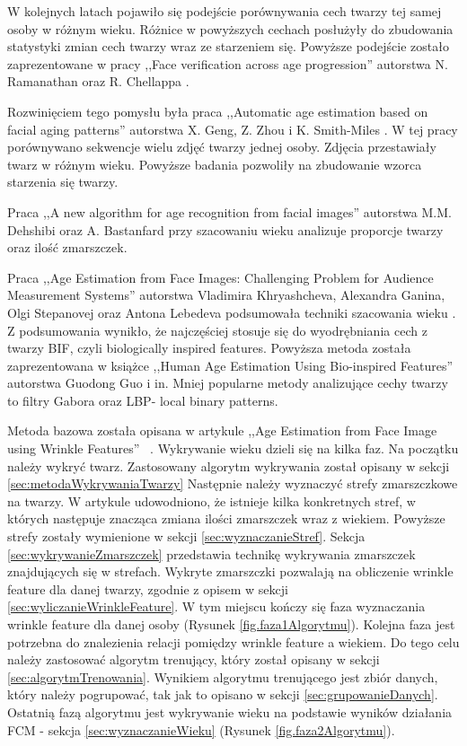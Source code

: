 \documentclass[a4paper,twoside,12pt]{book}
\begin{document}
    W kolejnych latach pojawiło się podejście porównywania cech twarzy tej samej osoby w różnym wieku.
    Różnice w powyższych cechach posłużyły do zbudowania statystyki zmian cech twarzy wraz ze starzeniem się.
    Powyższe podejście zostało zaprezentowane w pracy ,,Face verification across age progression''
    autorstwa N. Ramanathan oraz R. Chellappa \cite{ramanthanChelappa}.

    Rozwinięciem tego pomysłu była praca ,,Automatic age estimation based
    on facial aging patterns'' autorstwa X. Geng, Z. Zhou i K. Smith-Miles \cite{gengZhou}.
    W tej pracy porównywano sekwencje wielu zdjęć twarzy jednej osoby.
    Zdjęcia przestawiały twarz w różnym wieku.
    Powyższe badania pozwoliły na zbudowanie wzorca starzenia się twarzy.

    Praca ,,A new algorithm for age recognition
    from facial images'' autorstwa M.M. Dehshibi oraz A. Bastanfard \cite{dehshibiBastard} przy szacowaniu wieku
    analizuje proporcje twarzy oraz ilość zmarszczek.

    Praca ,,Age Estimation from Face Images: Challenging
    Problem for Audience Measurement Systems'' autorstwa
    Vladimira Khryashcheva, Alexandra Ganina, Olgi Stepanovej oraz
    Antona Lebedeva podsumowała techniki szacowania wieku \cite{khryashchevGanin}.
    Z podsumowania wynikło, że najczęściej stosuje się do wyodrębniania cech z twarzy BIF,
    czyli biologically inspired features.
    Powyższa metoda została zaprezentowana w książce ,,Human Age Estimation Using Bio-inspired Features''
    autorstwa Guodong Guo i in.
    Mniej popularne metody analizujące cechy twarzy to filtry Gabora oraz LBP- local binary patterns.


    Metoda bazowa została opisana w artykule ,,Age Estimation from Face Image using Wrinkle Features''
    ~\cite{wrinkleFeatures}.
    Wykrywanie wieku dzieli się na kilka faz.
    Na początku należy wykryć twarz.
    Zastosowany algorytm wykrywania został
    opisany w sekcji \ref{sec:metodaWykrywaniaTwarzy}
    Następnie należy wyznaczyć strefy zmarszczkowe na twarzy.
    W artykule \cite{wrinkleFeatures} udowodniono,
    że istnieje kilka konkretnych stref, w których następuje znacząca zmiana ilości zmarszczek wraz z wiekiem.
    Powyższe strefy zostały wymienione w sekcji \ref{sec:wyznaczanieStref}.
    Sekcja \ref{sec:wykrywanieZmarszczek} przedstawia technikę wykrywania zmarszczek znajdujących się w strefach.
    Wykryte zmarszczki
    pozwalają na obliczenie wrinkle feature dla danej twarzy, zgodnie z opisem w sekcji \ref{sec:wyliczanieWrinkleFeature}.
    W tym miejscu kończy się faza wyznaczania wrinkle feature dla danej osoby (Rysunek \ref{fig.faza1Algorytmu}).
    Kolejna faza
    jest potrzebna do
    znalezienia relacji pomiędzy wrinkle feature a wiekiem.
    Do tego celu należy zastosować algorytm trenujący, który
    został opisany w sekcji \ref{sec:algorytmTrenowania}.
    Wynikiem algorytmu trenującego jest zbiór danych, który
    należy pogrupować, tak jak to opisano w sekcji \ref{sec:grupowanieDanych}.
    Ostatnią fazą algorytmu jest wykrywanie wieku
    na podstawie wyników działania FCM - sekcja \ref{sec:wyznaczanieWieku} (Rysunek \ref{fig.faza2Algorytmu}).
\end{document}
